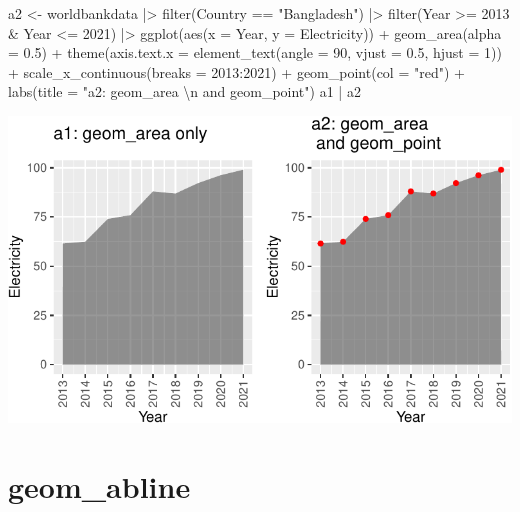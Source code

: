 \documentclass[
  letterpaper,
  DIV=11,
  numbers=noendperiod]{scrreprt}
\newenvironment{Shaded}{\begin{snugshade}}{\end{snugshade}}
\newcommand{\AttributeTok}[1]{\textcolor[rgb]{0.40,0.45,0.13}{#1}}
\newcommand{\DecValTok}[1]{\textcolor[rgb]{0.68,0.00,0.00}{#1}}
\newcommand{\FloatTok}[1]{\textcolor[rgb]{0.68,0.00,0.00}{#1}}
\newcommand{\FunctionTok}[1]{\textcolor[rgb]{0.28,0.35,0.67}{#1}}
\newcommand{\NormalTok}[1]{\textcolor[rgb]{0.00,0.23,0.31}{#1}}
\newcommand{\OtherTok}[1]{\textcolor[rgb]{0.00,0.23,0.31}{#1}}
\newcommand{\SpecialCharTok}[1]{\textcolor[rgb]{0.37,0.37,0.37}{#1}}
\newcommand{\StringTok}[1]{\textcolor[rgb]{0.13,0.47,0.30}{#1}}
\begin{document}
\begin{Shaded}
\begin{Highlighting}[]
\NormalTok{a2 }\OtherTok{\textless{}{-}}\NormalTok{ worldbankdata }\SpecialCharTok{|\textgreater{}}
  \FunctionTok{filter}\NormalTok{(Country }\SpecialCharTok{==} \StringTok{"Bangladesh"}\NormalTok{) }\SpecialCharTok{|\textgreater{}}
  \FunctionTok{filter}\NormalTok{(Year }\SpecialCharTok{\textgreater{}=} \DecValTok{2013} \SpecialCharTok{\&}\NormalTok{ Year }\SpecialCharTok{\textless{}=} \DecValTok{2021}\NormalTok{) }\SpecialCharTok{|\textgreater{}}
  \FunctionTok{ggplot}\NormalTok{(}\FunctionTok{aes}\NormalTok{(}\AttributeTok{x =}\NormalTok{ Year, }\AttributeTok{y =}\NormalTok{ Electricity)) }\SpecialCharTok{+}
  \FunctionTok{geom\_area}\NormalTok{(}\AttributeTok{alpha =} \FloatTok{0.5}\NormalTok{) }\SpecialCharTok{+}
  \FunctionTok{theme}\NormalTok{(}\AttributeTok{axis.text.x =} \FunctionTok{element\_text}\NormalTok{(}\AttributeTok{angle =} \DecValTok{90}\NormalTok{, }\AttributeTok{vjust =} \FloatTok{0.5}\NormalTok{, }\AttributeTok{hjust =} \DecValTok{1}\NormalTok{)) }\SpecialCharTok{+}
  \FunctionTok{scale\_x\_continuous}\NormalTok{(}\AttributeTok{breaks =} \DecValTok{2013}\SpecialCharTok{:}\DecValTok{2021}\NormalTok{) }\SpecialCharTok{+}
  \FunctionTok{geom\_point}\NormalTok{(}\AttributeTok{col =} \StringTok{"red"}\NormalTok{) }\SpecialCharTok{+}
  \FunctionTok{labs}\NormalTok{(}\AttributeTok{title =} \StringTok{"a2: geom\_area }\SpecialCharTok{\textbackslash{}n}\StringTok{ and geom\_point"}\NormalTok{)}
\NormalTok{a1 }\SpecialCharTok{|}\NormalTok{ a2}
\end{Highlighting}
\end{Shaded}

\includegraphics{a_files/figure-pdf/area-1.pdf}

\section{geom\_abline}\label{abline}
\end{document}
